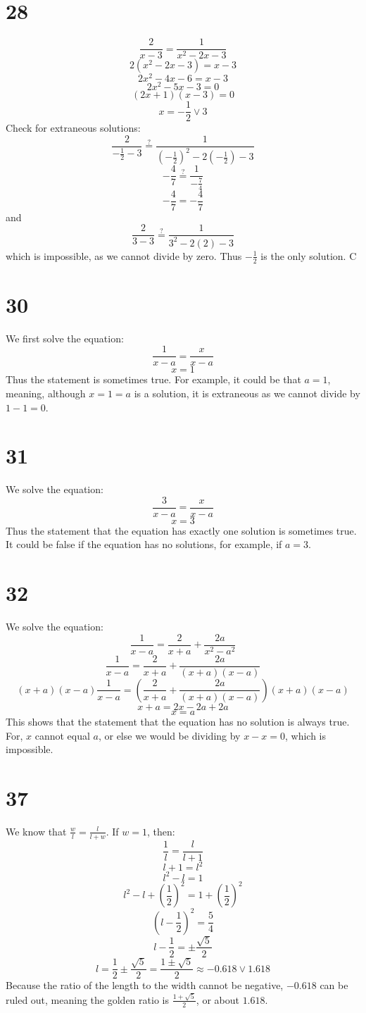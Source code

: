 \documentclass{article}
\theoremstyle{definition}
\newcommand{\?}{\stackrel{?}{=}}
\begin{document}
\section*{28}
\[ \frac{2}{x-3}=\frac{1}{x^2-2x-3} \] \[ 2(x^2-2x-3)=x-3 \] \[ 2x^2-4x-6=x-3 \] \[ 2x^2-5x-3=0 \] \[ (2x+1)(x-3)=0 \] \[ x=-\frac{1}{2}\vee 3 \]
Check for extraneous solutions:
\[ \frac{2}{-\frac{1}{2}-3}\?\frac{1}{(-\frac{1}{2})^2-2(-\frac{1}{2})-3} \]
\[ -\frac{4}{7}\?\frac{1}{-\frac{7}{4}} \] \[ -\frac{4}{7}=-\frac{4}{7} \]
and \[ \frac{2}{3-3}\?\frac{1}{3^2-2(2)-3} \] which is impossible, as we cannot divide by zero. Thus $-\frac{1}{2}$ is the only solution.
C

\section*{30}
We first solve the equation:
\[ \frac{1}{x-a}=\frac{x}{x-a} \] \[ x=1 \] 
Thus the statement is sometimes true. For example, it could be that $a=1$, meaning, although $x=1=a$ is a solution, it is 
extraneous as we cannot divide by $1-1=0$.

\section*{31}
We solve the equation:
\[ \frac{3}{x-a}=\frac{x}{x-a} \] \[ x=3 \] Thus the statement that the equation has exactly one solution is sometimes true. It could be false if the equation has no solutions, for example, 
if $a=3$.


\section*{32}
We solve the equation:
\[ \frac{1}{x-a}=\frac{2}{x+a}+\frac{2a}{x^2-a^2} \]
\[ \frac{1}{x-a}=\frac{2}{x+a}+\frac{2a}{(x+a)(x-a)} \]
\[ (x+a)(x-a)\frac{1}{x-a}=(\frac{2}{x+a}+\frac{2a}{(x+a)(x-a)})(x+a)(x-a) \]
\[ x+a=2x-2a+2a \]
\[ x=a \] This shows that the statement that the equation has no solution is always true. For, $x$ cannot equal $a$, or else we would be dividing by $x-x=0$, which is impossible.

\section*{37}
We know that $\frac{w}{l}=\frac{l}{l+w}$. If $w=1$, then:
\[ \frac{1}{l}=\frac{l}{l+1} \] \[ l+1=l^2 \] \[ l^2-l=1 \] \[ l^2-l+(\frac{1}{2})^2=1+(\frac{1}{2})^2 \]
\[ (l-\frac{1}{2})^2=\frac{5}{4} \]
\[ l-\frac{1}{2}=\pm\frac{\sqrt{5}}{2} \]
\[ l=\frac{1}{2}\pm\frac{\sqrt{5}}{2}=\frac{1\pm\sqrt{5}}{2}\approx -0.618\vee 1.618 \]
Because the ratio of the length to the width cannot be negative, $-0.618$ can be ruled out, meaning the golden ratio is $\frac{1+\sqrt{5}}{2}$, 
or about $1.618$.
\end{document}
